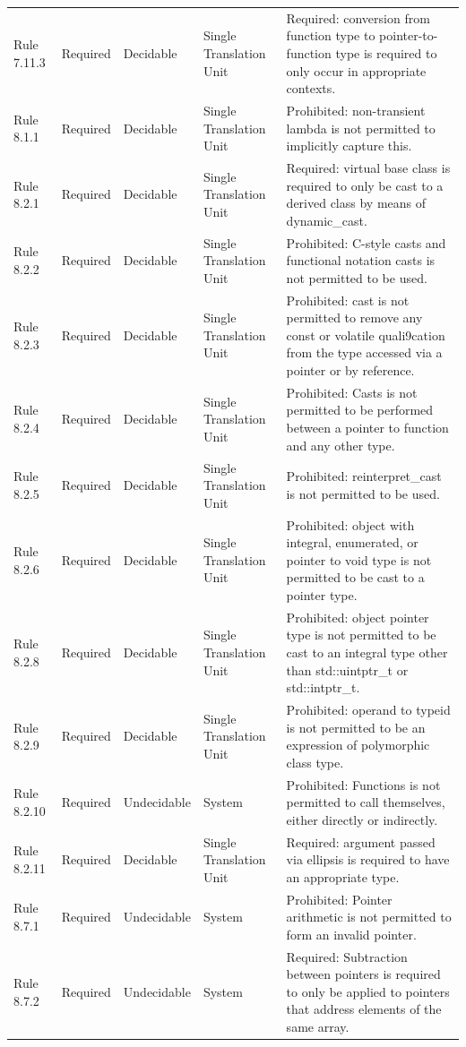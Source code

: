 \documentclass[11pt]{article}
\begin{document}
{\begin{longtable}{@{}P{2.2cm}P{1.7cm}P{2.1cm}P{3.0cm}P{6.7cm}@{}}
Rule 7.11.3 & Required & Decidable & Single Translation Unit & Required: conversion from function type to pointer-to-function type is required to only occur in appropriate contexts. \\
Rule 8.1.1 & Required & Decidable & Single Translation Unit & Prohibited: non-transient lambda is not permitted to implicitly capture this. \\
Rule 8.2.1 & Required & Decidable & Single Translation Unit & Required: virtual base class is required to only be cast to a derived class by means of dynamic\_cast. \\
Rule 8.2.2 & Required & Decidable & Single Translation Unit & Prohibited: C-style casts and functional notation casts is not permitted to be used. \\
Rule 8.2.3 & Required & Decidable & Single Translation Unit & Prohibited: cast is not permitted to remove any const or volatile quali9cation from the type accessed via a pointer or by reference. \\
Rule 8.2.4 & Required & Decidable & Single Translation Unit & Prohibited: Casts is not permitted to be performed between a pointer to function and any other type. \\
Rule 8.2.5 & Required & Decidable & Single Translation Unit & Prohibited: reinterpret\_cast is not permitted to be used. \\
Rule 8.2.6 & Required & Decidable & Single Translation Unit & Prohibited: object with integral, enumerated, or pointer to void type is not permitted to be cast to a pointer type. \\
Rule 8.2.8 & Required & Decidable & Single Translation Unit & Prohibited: object pointer type is not permitted to be cast to an integral type other than std::uintptr\_t or std::intptr\_t. \\
Rule 8.2.9 & Required & Decidable & Single Translation Unit & Prohibited: operand to typeid is not permitted to be an expression of polymorphic class type. \\
Rule 8.2.10 & Required & Undecidable & System & Prohibited: Functions is not permitted to call themselves, either directly or indirectly. \\
Rule 8.2.11 & Required & Decidable & Single Translation Unit & Required: argument passed via ellipsis is required to have an appropriate type. \\
Rule 8.7.1 & Required & Undecidable & System & Prohibited: Pointer arithmetic is not permitted to form an invalid pointer. \\
Rule 8.7.2 & Required & Undecidable & System & Required: Subtraction between pointers is required to only be applied to pointers that address elements of the same array. \\

\end{longtable}}
\end{document}
